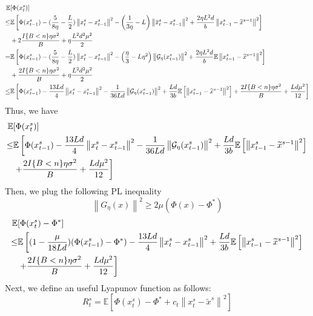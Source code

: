 \documentclass{article}
\newcommand*{\G}{\mathcal{G}}
\newcommand*{\E}{\mathbb{E}}
\newcommand{\norm}[1]{\left\lVert#1\right\rVert}
\theoremstyle{definition}
\theoremstyle{remark}
\begin{document}
{\color{Brown}
 \begin{align} 
\E&[\Phi({x}_{t}^s)] \notag
\\ \leq& \E\left[\Phi({x}_{t-1}^s)  -(\frac{5}{8\eta} - \frac{L}{2})\norm{{x}_t^s-x_{t-1}^s}^2- \left(\frac{1}{3\eta}-L\right)\norm{\overline{x}_t^s-x_{t-1}^s}^2+\frac{2\eta L^2 d}{b}\norm{x_{t-1}^s-\widetilde{x}^{s-1}}^2\right]\\
&+ 2\frac{I\{B < n\}\eta \sigma ^2}{B}+\eta \frac{L^2 d^2 \mu^2}{2}\label{eq30}\\
= & \E\left[\Phi({x}_{t-1}^s)  -(\frac{5}{8\eta} - \frac{L}{2})\norm{{x}_t^s-x_{t-1}^s}^2- \left(\frac{\eta}{3}-L\eta^2\right)\norm{\G_{\eta}(x_{t-1}^s)}^2+\frac{2\eta L^2 d}{b}\E\norm{x_{t-1}^s-\widetilde{x}^{s-1}}^2\right]
\\&+ \frac{2I\{B < n\}\eta \sigma ^2}{B}+\eta \frac{L^2 d^2 \mu^2}{2}\label{eq31}\\
\leq& \E\left[\Phi({x}_{t-1}^s)  -\frac{13Ld}{4}\norm{{x}_t^s-x_{t-1}^s}^2- \frac{1}{36 Ld}\norm{\G_{\eta}(x_{t-1}^s)}^2+\frac{L d}{3b}\E\left[\norm{x_{t-1}^s-\widetilde{x}^{s-1}}^2\right]+ \frac{2I\{B < n\}\eta \sigma ^2}{B}+ \frac{L d \mu^2}{12}\right]\label{eq32}
 \end{align}
 Thus, we have
  \begin{align} 
\E&[\Phi({x}_{t}^s)] \notag
\\ \leq& \E\left[\Phi({x}_{t-1}^s)  -\frac{13Ld}{4}\norm{{x}_t^s-x_{t-1}^s}^2- \frac{1}{36 Ld}\norm{\G_{\eta}(x_{t-1}^s)}^2+\frac{L d}{3b}\E\left[\norm{x_{t-1}^s-\widetilde{x}^{s-1}}^2\right]\right.\\
&\left.+ \frac{2I\{B < n\}\eta \sigma ^2}{B}+ \frac{L d \mu^2}{12}\right]\label{eq32}
 \end{align}
 Then, we plug the following PL inequality 
\begin{equation}
\norm{G_{\eta}(x)}^2 \geq 2\mu (\Phi(x) - \Phi^*)
\end{equation}
\begin{align} 
\E&[\Phi({x}_{t}^s)-\Phi^*] \notag
\\ \leq& \E\left[(1- \frac{\mu}{18 Ld})(\Phi({x}_{t-1}^s)-\Phi^*)  -\frac{13Ld}{4}\norm{{x}_t^s-x_{t-1}^s}^2+\frac{L d}{3b}\E\left[\norm{x_{t-1}^s-\widetilde{x}^{s-1}}^2\right]\right.\\
&\left.+ \frac{2I\{B < n\}\eta \sigma ^2}{B}+ \frac{L d \mu^2}{12}\right]\label{eq32}
 \end{align}
 Next, we define an useful Lyapunov function as follows:
 \begin{equation}
 R_t^s = \E[\Phi(x_t^s) -\Phi^*+ c_t\norm{x_t^s - \tilde{x}^s}^2]

\end{equation}}
\end{document}
